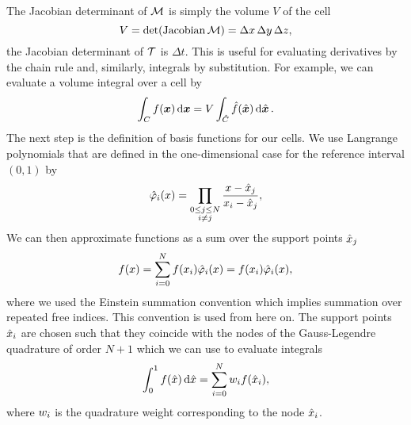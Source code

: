 The Jacobian determinant of $\mapping$ is simply the volume $V$ of the cell
\begin{equation}
  \label{eq:determinant-mapping}
  \volume = \operatorname{det}(\operatorname{Jacobian}\mapping) = \Delta x \, \Delta y \,\Delta z,
\end{equation}
the Jacobian determinant of $\timeMapping$ is $\Delta t$.
This is useful for evaluating derivatives by the chain rule and, similarly, integrals by substitution.
For example, we can evaluate a volume integral over a cell by
\begin{equation}
  \label{eq:integration-by-substitution}
  \intdcell{
f(\bm{x})
  }
  =
\volume \intdrefcell{
    \hat{f}(\hat{\bm{x}})
  }.
\end{equation}
The next step is the definition of basis functions for our cells.
We use Langrange polynomials that are defined in the one-dimensional case for the reference interval $(0,1)$ by
\begin{align}
  \label{eq:lagrange-basis}
    \lagrangeRef(x) = \prod_{\substack{0 \leq j \leq N \\ i \neq j}} \frac{x - {\quadNode[j]}}{x_i - \quadNode[j]},
\end{align}
We can then approximate functions as a sum over the support points $\quadNode[j]$
\begin{equation}
  \label{eq:langrange-expansion-1d}
  f(x) = \sum_{i = 0}^N f(x_i) \lagrangeRef[i](x) = f(x_i) \lagrangeRef[i](x),
\end{equation}
where we used the Einstein summation convention which implies summation over repeated free indices.
This convention is used from here on.
The support points $\quadNode[i]$ are chosen such that they coincide with the nodes of the Gauss-Legendre quadrature of order $N+1$ which we can use to evaluate integrals
\begin{equation}
  \label{eq:quadrature-1d}
  \int_0^1 f(\hat{x}) \dd{\hat{x}} = \sum_{i=0}^{N} \quadWeight[i] f(\quadNode[i]),
\end{equation}
where $\quadWeight[i]$ is the quadrature weight corresponding to the node $\quadNode[i]$.

